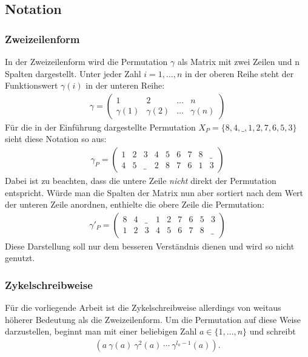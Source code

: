 \documentclass{fh-ium-bama}
\begin{document}
\subsection{Notation}
\subsubsection*{Zweizeilenform}
In der Zweizeilenform wird die Permutation $\gamma$ als Matrix mit zwei Zeilen und n Spalten dargestellt. Unter jeder Zahl $i = 1,\dots,n$ in der oberen Reihe steht der Funktionswert $\gamma(i)$ in der unteren Reihe:
\begin{gather*}
\gamma =
\begin{pmatrix}
	1 & 2 & \dots & n \\
	\gamma(1) & \gamma(2) & \dots & \gamma(n)
\end{pmatrix}
\end{gather*}
Für die in der Einführung dargestellte Permutation $X_P = \{8, 4, \_, 1, 2, 7, 6, 5, 3\}$ sieht diese Notation so aus:
\begin{gather*}
\gamma_P =
\begin{pmatrix}
	1 & 2 & 3 & 4 & 5 & 6 & 7 & 8 & \_ \\
	4 & 5 & \_ & 2 & 8 & 7 & 6 & 1 & 3
\end{pmatrix}
\end{gather*}
Dabei ist zu beachten, dass die untere Zeile \textit{nicht} direkt der Permutation entspricht. Würde man die Spalten der Matrix nun aber sortiert nach dem Wert der unteren Zeile anordnen, enthielte die obere Zeile die Permutation:
\begin{gather*}
\gamma'_P = 
\begin{pmatrix}
	8 & 4 & \_ & 1 & 2 & 7 & 6 & 5 & 3 \\
	1 & 2 & 3 & 4 & 5 & 6 & 7 & 8 & \_
\end{pmatrix}
\end{gather*}
Diese Darstellung soll nur dem besseren Verständnis dienen und wird so nicht genutzt.

\subsubsection*{Zykelschreibweise}
Für die vorliegende Arbeit ist die Zykelschreibweise allerdings von weitaus höherer Bedeutung als die Zweizeilenform. Um die Permutation auf diese Weise darzustellen, beginnt man mit einer beliebigen Zahl $a \in \{1,\dots,n\}$ und schreibt
\begin{gather*}
(a ~ \gamma(a) ~ \gamma^2(a) ~ \cdots ~ \gamma^{l_a-1}(a))\text{.}
\end{gather*}
\end{document}
